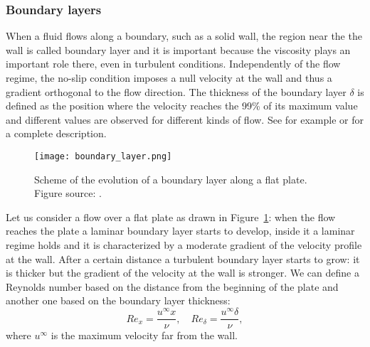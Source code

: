 \subsubsection{Boundary layers} \label{subsec:bl}
When a fluid flows along a boundary, such as a solid wall, the region near the 
the wall is called boundary layer and it is important because the 
viscosity plays an important role there, even in turbulent conditions.
Independently of the flow regime, the no-slip condition imposes a null velocity 
at the wall and thus a gradient orthogonal to the flow direction. The thickness 
of the boundary layer $\delta$ is defined as the position where the velocity 
reaches the 99\% of its maximum value and different values are observed for 
different kinds of flow.  See for 
example \cite{main:pope} or \cite{main:davidson} for a complete description.
\begin{figure}
	\centering
	\texttt{[image: boundary\_layer.png]}
	\caption[Boundary layer along a flat plate]{Scheme of the evolution of a 
	boundary layer along a flat plate. Figure source: \cite{tesi:fetzer}.}
	\label{fig:bl}
\end{figure}

Let us consider a flow over a flat plate as drawn in Figure~\ref{fig:bl}: when 
the flow reaches the plate a laminar boundary layer starts to develop, inside 
it a laminar regime holds and it is characterized by a moderate gradient of the 
velocity profile at the wall. After a certain distance a turbulent boundary 
layer starts to grow: it is thicker but the gradient of the velocity at the 
wall is stronger. We can define a Reynolds number based on the distance from 
the beginning of the plate and another one based on the boundary layer 
thickness:
\begin{equation}
Re_x = \frac{u^\infty x}{\nu}, \quad Re_\delta = \frac{u^\infty 
	\delta}{\nu},
\end{equation}
where $u^\infty$ is the maximum velocity far from the wall.

